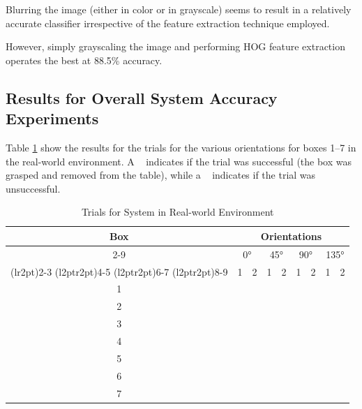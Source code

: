 \documentclass[letterpaper, 10 pt, conference]{conf/ieeeconf}  %
\newcommand{\cmark}{\ding{51}}%
\newcommand{\xmark}{\ding{55}}%
\begin{document}
Blurring the image (either in color or in grayscale) seems to result in a
relatively accurate classifier irrespective of the feature extraction technique
employed.

However, simply grayscaling the image and performing HOG feature
extraction operates the best at 88.5\% accuracy.

\subsection{Results for Overall System Accuracy Experiments}

Table \ref{tab:trials_real_world} show the results for the trials for the
various orientations for boxes 1--7 in the real-world environment. A \cmark~
indicates if the trial was successful (the box was grasped and removed from the
table), while a \xmark~ indicates if the trial was unsuccessful.
\begin{table}[H]
  \centering
  \begin{tabular}{c c c c c c c c c}
    \toprule
    \multirow{4}{*}[-0.5\dimexpr \aboverulesep + \belowrulesep + \cmidrulewidth]{Box} & \multicolumn{8}{c}{Orientations}\\
    \cmidrule(rl){2-9}
                                                                                      & \multicolumn{2}{c}{\ang{0}} & \multicolumn{2}{c}{\ang{45}} & \multicolumn{2}{c}{\ang{90}} & \multicolumn{2}{c}{\ang{135}} \\
    \cmidrule(lr{2pt}){2-3}
    \cmidrule(l{2pt}r{2pt}){4-5}
    \cmidrule(l{2pt}r{2pt}){6-7}
    \cmidrule(l{2pt}r{2pt}){8-9}
                                                                                      & 1      & 2      & 1      & 2      &  1     & 2      &  1     &  2     \\
    \midrule
    1 & \cmark & \cmark & \cmark & \cmark & \cmark & \cmark & \cmark & \cmark \\
    2 & \cmark & \cmark & \cmark & \cmark & \cmark & \cmark & \cmark & \cmark \\
    3 & \cmark & \cmark & \cmark & \cmark & \cmark & \cmark & \cmark & \cmark \\
    4 & \cmark & \cmark & \cmark & \cmark & \cmark & \cmark & \cmark & \cmark \\
    5 & \cmark & \cmark & \cmark & \cmark & \cmark & \cmark & \cmark & \cmark \\
    6 & \cmark & \cmark & \cmark & \cmark & \cmark & \cmark & \cmark & \cmark \\
    7 & \cmark & \cmark & \cmark & \cmark & \cmark & \cmark & \cmark & \cmark \\
    \bottomrule
  \end{tabular}
  \caption{Trials for System in Real-world Environment}
  \label{tab:trials_real_world}
\end{table}
\end{document}
